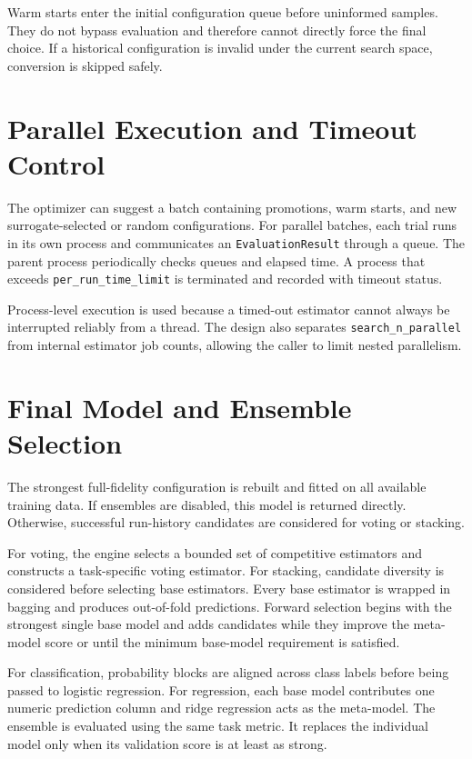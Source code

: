 \documentclass[12pt,a4paper,oneside]{report}
\begin{document}
\medskip

\noindent Warm starts enter the initial configuration queue before uninformed samples.
They do not bypass evaluation and therefore cannot directly force the final
choice. If a historical configuration is invalid under the current search
space, conversion is skipped safely.

\section{Parallel Execution and Timeout Control}

The optimizer can suggest a batch containing promotions, warm starts, and new
surrogate-selected or random configurations. For parallel batches, each trial
runs in its own process and communicates an \texttt{EvaluationResult} through a
queue. The parent process periodically checks queues and elapsed time. A process
that exceeds \texttt{per\_run\_time\_limit} is terminated and recorded with
timeout status.

\medskip

\noindent Process-level execution is used because a timed-out estimator cannot always be
interrupted reliably from a thread. The design also separates
\texttt{search\_n\_parallel} from internal estimator job counts, allowing the
caller to limit nested parallelism.

\section{Final Model and Ensemble Selection}

The strongest full-fidelity configuration is rebuilt and fitted on all
available training data. If ensembles are disabled, this model is returned
directly. Otherwise, successful run-history candidates are considered for
voting or stacking.

\medskip

\noindent For voting, the engine selects a bounded set of competitive estimators and
constructs a task-specific voting estimator. For stacking, candidate diversity
is considered before selecting base estimators. Every base estimator is wrapped
in bagging and produces out-of-fold predictions. Forward selection begins with
the strongest single base model and adds candidates while they improve the
meta-model score or until the minimum base-model requirement is satisfied.

\medskip

\noindent For classification, probability blocks are aligned across class labels before
being passed to logistic regression. For regression, each base model contributes
one numeric prediction column and ridge regression acts as the meta-model. The
ensemble is evaluated using the same task metric. It replaces the individual
model only when its validation score is at least as strong.
\end{document}
